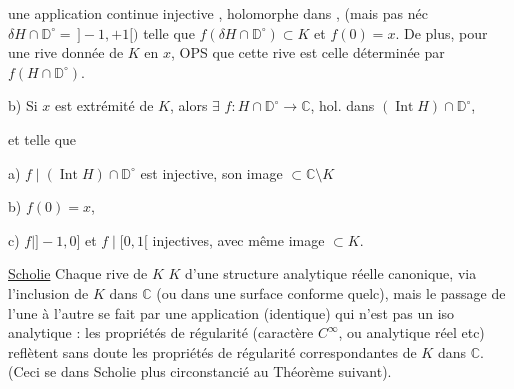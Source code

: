  une application continue injective
,
holomorphe dans 
,
\deleted{$=\,]-1,+1[\quad(\unsure{\ne}\ \mathbb D^{++}\amalg \mathbb D^{--})$}
(mais pas néc \ 
$\delta H\cap\mathbb D^\circ=\,]-1,+1[)$ telle que
$f(\delta H\cap\mathbb D^\circ)\subset K$ et
$f(0)=x$. De plus, pour une rive donnée de
$K$ en $x$, OPS que cette rive est celle déterminée
par  $f(H\cap\mathbb D^\circ)$.

b) Si $x$ est extrémité de $K$, alors $\exists$
$f:H\cap\mathbb D^\circ\longrightarrow\mathbb C$, hol. 
dans $(\operatorname{Int}H)\cap\mathbb D^\circ$, 
\deleted{$\unsure{f\,]-1,0)}$}
\deleted{$f\mid[-1,0]$ et $f\mid[0,1[$ soient injectifs,}


et telle que

a) $f\mid(\operatorname{Int}H)\cap\mathbb D^\circ$ est injective, son image $\subset\mathbb C\setminus K$

b) $f(0)=x$, 

c) $f\mid]-1,0]$ et $f\mid[0,1[$ injectives, avec
même image $\subset K$.

\uline{Scholie} Chaque rive de $K$  $K$ d'une
structure analytique réelle canonique, via
l'inclusion de $K$ dans $\mathbb C$ (ou dans une
surface conforme quelc), mais le passage
de l'une à l'autre se fait par une
application (identique) qui n'est pas un
iso analytique : les propriétés de régularité
(caractère $C^\infty$, ou analytique réel etc)
reflètent sans doute les propriétés de
régularité correspondantes de $K$ dans $\mathbb C$.
(Ceci  se  dans  Scholie
plus circonstancié au Théorème suivant).


